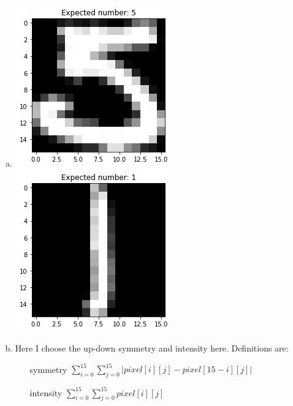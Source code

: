 \documentclass{article}
\def\math#1{$#1$}
\begin{document}
\begin{enumerate}[a)]
    \item \includegraphics[]{images/hand/1} \includegraphics[]{images/hand/2}
    \item Here I choose the up-down symmetry and intensity here. Definitions are: 
        \begin{itemize}
            \item [symmetry] \math{\sum_{i = 0}^{15}\sum_{j = 0}^{15}|pixel[i][j] - pixel[15 - i][j]|} 
            \item [intensity] \math{\sum_{i = 0}^{15}\sum_{j = 0}^{15}pixel[i][j]}
        \end{itemize}

\end{enumerate}
\end{document}
